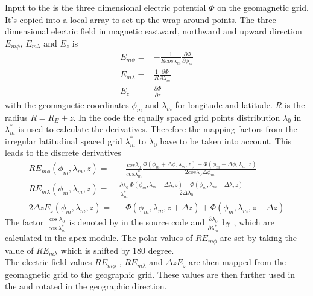 Input to the  is the three dimensional
electric potential $\Phi$ on the geomagnetic grid. It's copied into
a local array to set up the wrap around points. The three
dimensional electric field in magnetic eastward, northward and
upward direction $E_{m \phi}$, $E_{m \lambda}$ and $E_z$ is
%
\begin{align}
   E_{m \phi}    = & - \frac{1}{R cos \lambda_m} \frac{\partial \Phi}{\partial \phi_m}\\
   E_{m \lambda} = & \frac{1}{R } \frac{\partial \Phi}{\partial
   \lambda_m} \\
   E_{z}  = & \frac{\partial \Phi}{\partial z}
\end{align}
%
with the geomagnetic coordinates $\phi_m$ and $\lambda_m$ for
longitude and latitude. $R$ is the radius $R=R_E+z$. In the code the
equally spaced grid points distribution $\lambda_0$ in $\lambda_m^*$
is used to calculate the derivatives. Therefore the mapping factors
from the irregular latitudinal spaced grid $\lambda_m^*$ to
$\lambda_0$ have to be taken into account. This leads to the
discrete derivatives
%
\begin{align}
   R E_{m \phi}(\phi_m,\lambda_m,z)    = & - \frac{cos \lambda_0}{ cos \lambda_m^*}
           \frac{\Phi(\phi_m+\Delta \phi,\lambda_m,z)-\Phi(\phi_m-\Delta \phi,\lambda_m,z)}{2 cos \lambda_0\Delta \phi_m}\\
   R E_{m \lambda}(\phi_m,\lambda_m,z) = & \frac{\partial \lambda_0}{\lambda_m^* }
   \frac{ \Phi(\phi_m,\lambda_m+\Delta \lambda,z)-\Phi(\phi_m,\lambda_m-\Delta \lambda,z)}{2 \Delta \lambda_0} \\
   2\Delta z E_{z}(\phi_m,\lambda_m,z)  = & - \Phi(\phi_m,\lambda_m,z+\Delta z)+\Phi(\phi_m,\lambda_m,z-\Delta z)
\end{align}
%
The factor $\frac{\cos \lambda_0}{ \cos \lambda_m^*}$ is denoted by
 in the source code and $\frac{\partial
\lambda_0}{\partial \lambda_m^* }$ by , which are
calculated in the apex-module. The polar values of $R E_{m \phi}$
are set by taking the value of $R E_{m \lambda}$ which is shifted by
180 degree. \\
%
The electric field  values $R E_{m \phi}$ , $R E_{m \lambda}$ and
$\Delta z E_{z}$ are then mapped from the geomagnetic grid to the
geographic grid. These values are then further used in the
 and rotated in the geographic direction.
